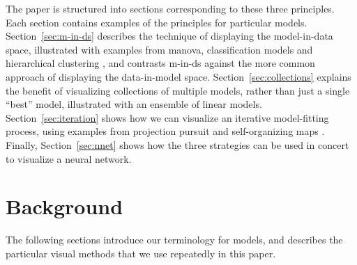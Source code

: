 \documentclass[preprint]{imsart}
\begin{document}
The paper is structured into sections corresponding to these three principles. Each section contains examples of the principles for particular models. Section~\ref{sec:m-in-ds} describes the technique of displaying the model-in-data space, illustrated with examples from {\sc manova}, classification models and hierarchical clustering \citep{JW02}, and contrasts m-in-ds against the more common approach of displaying the data-in-model space. Section~\ref{sec:collections} explains the benefit of visualizing collections of multiple models, rather than just a single ``best'' model, illustrated with an ensemble of linear models. Section~\ref{sec:iteration} shows how we can visualize an iterative model-fitting process, using examples from projection pursuit \citep{friedman:1974,huber:1985} and self-organizing maps \citep{kohonen:2001}. Finally, Section~\ref{sec:nnet} shows how the three strategies can be used in concert to visualize a neural network.

\section{Background}
\label{sec:model}

The following sections introduce our terminology for models, and describes the particular visual methods that we  use repeatedly in this paper.




\end{document}
